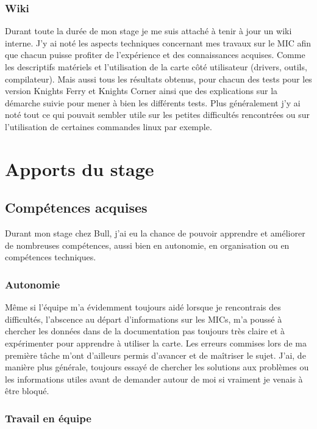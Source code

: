 \documentclass[11pt]{article}
\begin{document}
			\subsubsection{Wiki}
			Durant toute la durée de mon stage je me suis attaché à tenir à jour un wiki interne. J'y ai noté les aspects techniques 
			concernant mes travaux sur le MIC afin que chacun puisse profiter de l'expérience et des connaissances acquises. 
			Comme les descriptifs matériels et l'utilisation de la carte côté utilisateur (drivers, outils, compilateur).
			Mais aussi tous les résultats obtenus, pour chacun des tests pour les version Knights Ferry et Knights Corner ainsi 
			que des explications sur la démarche suivie pour mener à bien les différents tests. \newline
			Plus généralement j'y ai noté tout ce qui pouvait sembler utile sur les petites difficultés rencontrées ou sur l'utilisation 
			de certaines commandes linux par exemple.
	\section{Apports du stage}
		\subsection{Compétences acquises}
		Durant mon stage chez Bull, j'ai eu la chance de pouvoir apprendre et améliorer de nombreuses compétences, aussi bien 
		en autonomie, en organisation ou en compétences techniques.
			\subsubsection{Autonomie}
			Même si l'équipe m'a évidemment toujours aidé lorsque je rencontrais des difficultés, l'abscence au départ 
			d'informations sur les MICs, m'a poussé à chercher les données dans de la documentation pas toujours très claire et à 
			expérimenter pour apprendre à utiliser la carte. Les erreurs commises lors de ma première tâche m'ont d'ailleurs permis d'avancer 
			et de maîtriser le sujet. J'ai, de manière plus générale, toujours essayé de chercher les solutions aux problèmes ou les 
			informations utiles avant de demander autour de moi si vraiment je venais à être bloqué.
			\subsubsection{Travail en équipe}
\end{document}
